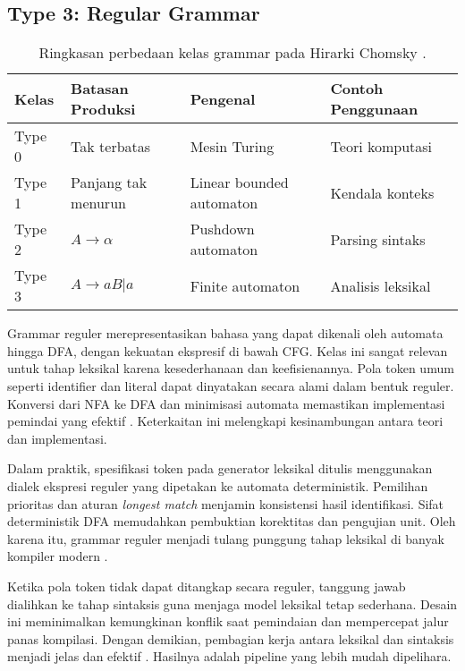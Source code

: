 \documentclass[../main.tex]{subfiles}
\begin{document}
\subsection{Type 3: Regular Grammar}
\begin{table}[t]
  \centering
  \caption{Ringkasan perbedaan kelas grammar pada Hirarki Chomsky \citep{WikiChomsky}.}
  \label{tab:chomsky}
  \begin{tabular}{@{}llll@{}}
    \toprule
    Kelas & Batasan Produksi & Pengenal & Contoh Penggunaan \\
    \midrule
    Type 0 & Tak terbatas & Mesin Turing & Teori komputasi \\
    Type 1 & Panjang tak menurun & Linear bounded automaton & Kendala konteks \\
    Type 2 & $A \rightarrow \alpha$ & Pushdown automaton & Parsing sintaks \\
    Type 3 & $A \rightarrow aB | a$ & Finite automaton & Analisis leksikal \\
    \bottomrule
  \end{tabular}
\end{table}

Grammar reguler merepresentasikan bahasa yang dapat dikenali oleh automata hingga DFA, dengan kekuatan ekspresif di bawah CFG. Kelas ini sangat relevan untuk tahap leksikal karena kesederhanaan dan keefisienannya. Pola token umum seperti identifier dan literal dapat dinyatakan secara alami dalam bentuk reguler. Konversi dari NFA ke DFA dan minimisasi automata memastikan implementasi pemindai yang efektif \citep{WikiRegex,WikiNFA,WikiDFA,WikiDFAMin}. Keterkaitan ini melengkapi kesinambungan antara teori dan implementasi.

Dalam praktik, spesifikasi token pada generator leksikal ditulis menggunakan dialek ekspresi reguler yang dipetakan ke automata deterministik. Pemilihan prioritas dan aturan \emph{longest match} menjamin konsistensi hasil identifikasi. Sifat deterministik DFA memudahkan pembuktian korektitas dan pengujian unit. Oleh karena itu, grammar reguler menjadi tulang punggung tahap leksikal di banyak kompiler modern \citep{FlexManual}.


Ketika pola token tidak dapat ditangkap secara reguler, tanggung jawab dialihkan ke tahap sintaksis guna menjaga model leksikal tetap sederhana. Desain ini meminimalkan kemungkinan konflik saat pemindaian dan mempercepat jalur panas kompilasi. Dengan demikian, pembagian kerja antara leksikal dan sintaksis menjadi jelas dan efektif \citep{WikiRegex}. Hasilnya adalah pipeline yang lebih mudah dipelihara.
\end{document}
